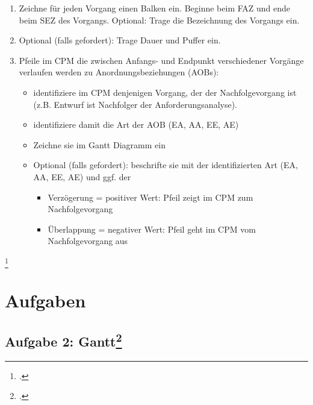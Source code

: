\documentclass{lehramt-informatik-haupt}
\begin{document}
\begin{enumerate}
\item Zeichne für jeden Vorgang einen Balken ein. Beginne beim FAZ und
ende beim SEZ des Vorgangs. Optional: Trage die Bezeichnung des Vorgangs
ein.

\item Optional (falls gefordert): Trage Dauer und Puffer ein.

\item Pfeile im CPM die zwischen Anfangs- und Endpunkt verschiedener
Vorgänge verlaufen werden zu Anordnungsbeziehungen (AOBs):

\begin{itemize}
\item identifiziere im CPM denjenigen Vorgang, der der Nachfolgevorgang
ist (z.B. Entwurf ist Nachfolger der Anforderungsanalyse).

\item identifiziere damit die Art der AOB (EA, AA, EE, AE)

\item Zeichne sie im Gantt Diagramm ein

\item Optional (falls gefordert): beschrifte sie mit der identifizierten
Art (EA, AA, EE, AE) und ggf. der

\begin{itemize}
\item Verzögerung = positiver Wert: Pfeil zeigt im CPM zum
Nachfolgevorgang

\item Überlappung = negativer Wert: Pfeil geht im CPM vom
Nachfolgevorgang aus
\end{itemize}
\end{itemize}
\end{enumerate}

\footcite[Seite 36]{sosy:fs:3}


\chapter{Aufgaben}

%

\section{Aufgabe 2: Gantt\footcite[Seite 1]{sosy:ab:5}}
\end{document}
